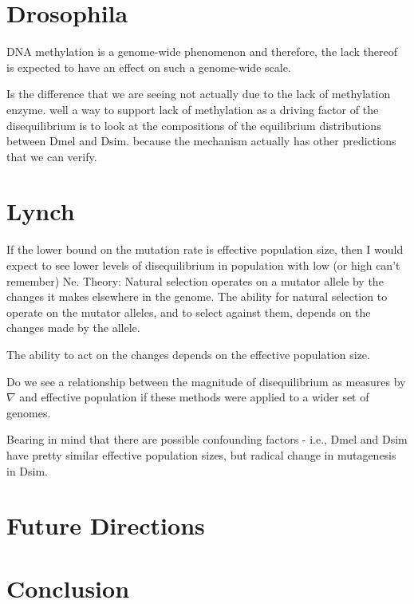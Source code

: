 \section{Drosophila}

 DNA methylation is a genome-wide phenomenon and therefore, the lack thereof is expected to have an effect on such a genome-wide scale.  
 
 
 Is the difference that we are seeing not actually due to the lack of methylation enzyme. well a way to support lack of methylation as a driving factor of the disequilibrium is to look at the compositions of the equilibrium distributions between Dmel and Dsim. because the mechanism actually has other predictions that we can verify. 

\section{Lynch}

If the lower bound on the mutation rate is effective population size, then I would expect to see lower levels of disequilibrium in population with low (or high can't remember) Ne. 
Theory: Natural selection operates on a mutator allele by the changes it makes elsewhere in the genome. 
The ability for natural selection to operate on the mutator alleles, and to select against them, depends on the changes made by the allele. 

The ability to act on the changes depends on the effective population size. 

Do we see a relationship between the magnitude of disequilibrium as measures by $\nabla$ and effective population if these methods were applied to a wider set of genomes. 

Bearing in mind that there are possible confounding factors - i.e., Dmel and Dsim have pretty similar effective population sizes, but radical change in mutagenesis in Dsim. 



\section{Future Directions}


\section{Conclusion}